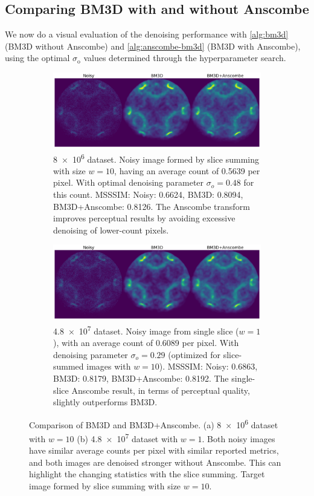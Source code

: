 \subsection{Comparing BM3D with and without Anscombe}
We now do a visual evaluation of the denoising performance with \cref{alg:bm3d} (\gls{BM3D} without Anscombe) and \cref{alg:anscombe-bm3d} (\gls{BM3D} with Anscombe), using the optimal $\sigma_{\text{o}}$ values determined through the hyperparameter search.
\begin{figure}
    \centering
    \begin{subfigure}[b]{1\linewidth}
        \centering
        \includegraphics[width=1\linewidth]{images/noisy_denoised_bm3d_anscombe_8M_10slices_optimal_sigma.pdf}
        \caption{\num{8e6} dataset. Noisy image formed by slice summing with size $w=10$, having an average count of \num{0.5639} per pixel. With optimal denoising parameter $\sigma_o = 0.48$ for this count. \gls{MSSSIM}: Noisy: 0.6624, BM3D: 0.8094, BM3D+Anscombe: 0.8126. The Anscombe transform improves perceptual results by avoiding excessive denoising of lower-count pixels.}
    \end{subfigure}
    \begin{subfigure}[b]{1\linewidth}
        \centering
        \includegraphics[width=1\linewidth]{images/noisy_denoised_bm3d_anscombe_48M_single_slice_sigma_1.pdf}
        \caption{\num{4.8e7} dataset. Noisy image from single slice ($w=1$), with an average count of \num{0.6089} per pixel. With denoising parameter $\sigma_o = 0.29$ (optimized for slice-summed images with $w = 10$). \gls{MSSSIM}: Noisy: 0.6863, BM3D: 0.8179, BM3D+Anscombe: 0.8192. The single-slice Anscombe result, in terms of perceptual quality, slightly outperforms BM3D.}
        \label{}
    \end{subfigure}
    \caption{Comparison of BM3D and BM3D+Anscombe. (a) \num{8e6} dataset with $w=10$ (b) \num{4.8e7} dataset with $w=1$. Both noisy images have similar average counts per pixel with similar reported metrics, and both images are denoised stronger without Anscombe. This can highlight the changing statistics with the slice summing.
     Target image formed by slice summing with size $w=10$.}
    \label{}
\end{figure}

